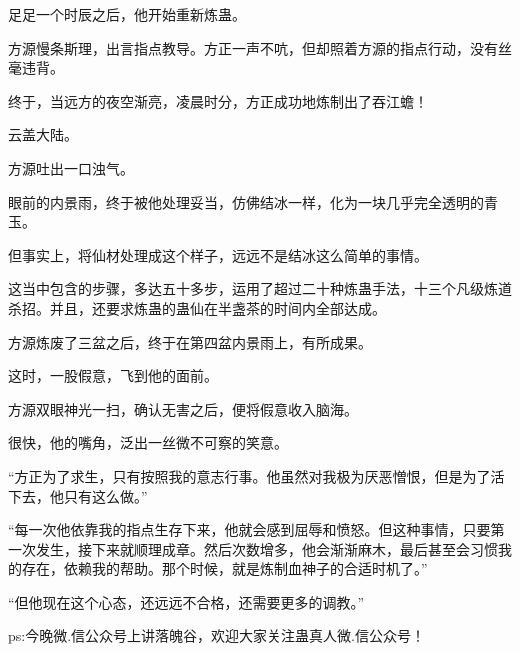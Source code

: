 \begin{this_body}
足足一个时辰之后，他开始重新炼蛊。

方源慢条斯理，出言指点教导。方正一声不吭，但却照着方源的指点行动，没有丝毫违背。

终于，当远方的夜空渐亮，凌晨时分，方正成功地炼制出了吞江蟾！

云盖大陆。

方源吐出一口浊气。

眼前的内景雨，终于被他处理妥当，仿佛结冰一样，化为一块几乎完全透明的青玉。

但事实上，将仙材处理成这个样子，远远不是结冰这么简单的事情。

这当中包含的步骤，多达五十多步，运用了超过二十种炼蛊手法，十三个凡级炼道杀招。并且，还要求炼蛊的蛊仙在半盏茶的时间内全部达成。

方源炼废了三盆之后，终于在第四盆内景雨上，有所成果。

这时，一股假意，飞到他的面前。

方源双眼神光一扫，确认无害之后，便将假意收入脑海。

很快，他的嘴角，泛出一丝微不可察的笑意。

“方正为了求生，只有按照我的意志行事。他虽然对我极为厌恶憎恨，但是为了活下去，他只有这么做。”

“每一次他依靠我的指点生存下来，他就会感到屈辱和愤怒。但这种事情，只要第一次发生，接下来就顺理成章。然后次数增多，他会渐渐麻木，最后甚至会习惯我的存在，依赖我的帮助。那个时候，就是炼制血神子的合适时机了。”

“但他现在这个心态，还远远不合格，还需要更多的调教。”

ps:今晚微.信公众号上讲落魄谷，欢迎大家关注蛊真人微.信公众号！

\end{this_body}

